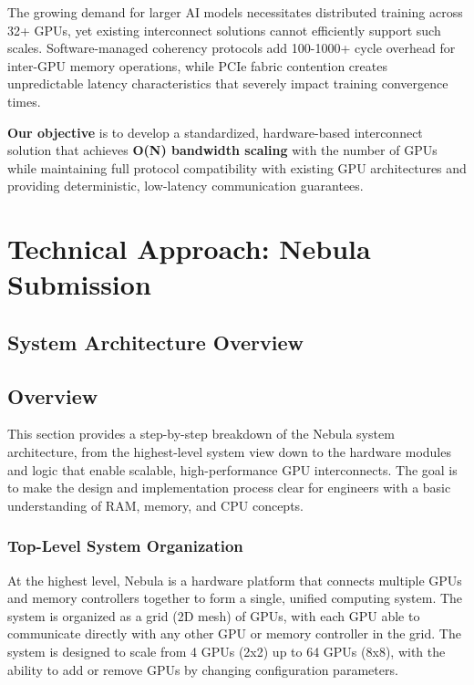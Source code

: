 \documentclass[11pt,a4paper]{article}
\begin{document}
The growing demand for larger AI models necessitates distributed training across 32+ GPUs, yet existing interconnect solutions cannot efficiently support such scales. Software-managed coherency protocols add 100-1000+ cycle overhead for inter-GPU memory operations, while PCIe fabric contention creates unpredictable latency characteristics that severely impact training convergence times.

\textbf{Our objective} is to develop a standardized, hardware-based interconnect solution that achieves \textbf{O(N) bandwidth scaling} with the number of GPUs while maintaining full protocol compatibility with existing GPU architectures and providing deterministic, low-latency communication guarantees.

\section{Technical Approach: Nebula Submission}

\subsection{System Architecture Overview}

\subsection*{Overview}
This section provides a step-by-step breakdown of the Nebula system architecture, from the highest-level system view down to the hardware modules and logic that enable scalable, high-performance GPU interconnects. The goal is to make the design and implementation process clear for engineers with a basic understanding of RAM, memory, and CPU concepts.

\subsubsection{Top-Level System Organization}
At the highest level, Nebula is a hardware platform that connects multiple GPUs and memory controllers together to form a single, unified computing system. The system is organized as a grid (2D mesh) of GPUs, with each GPU able to communicate directly with any other GPU or memory controller in the grid. The system is designed to scale from 4 GPUs (2x2) up to 64 GPUs (8x8), with the ability to add or remove GPUs by changing configuration parameters.
\end{document}
